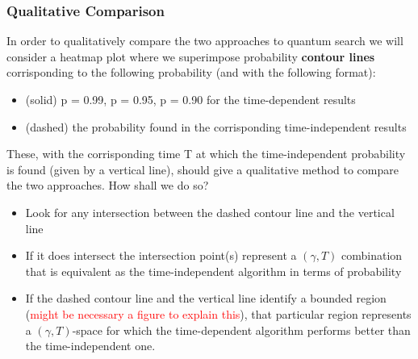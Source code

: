 \documentclass[aps,pra,reprint, onecolumn]{revtex4-2}
\newcommand{\red}[1]{\textcolor{red}{#1}}
\begin{document}
\subsubsection{\textbf{Qualitative Comparison}}
In order to qualitatively compare the two approaches to quantum search we will consider a heatmap plot where we superimpose probability \textbf{contour lines} corrisponding to the following probability (and with the following format):
\begin{itemize}
  \item (solid) p = 0.99, p = 0.95, p = 0.90 for the time-dependent results
  \item (dashed) the probability found in the corrisponding time-independent results
\end{itemize}
These, with the corrisponding time T at which the time-independent probability is found (given by a vertical line), should give a qualitative method to compare the two approaches. How shall we do so?
\begin{itemize}
	\item Look for any intersection between the dashed contour line and the vertical line
	\item If it does intersect the intersection point(s) represent a $(\gamma, T)$ combination that is equivalent as the time-independent algorithm in terms of probability
	\item If the dashed contour line and the vertical line identify a bounded region (\red{might be necessary a figure to explain this}), that particular region represents a $(\gamma, T)$-space for which the time-dependent algorithm performs better than the time-independent one. 
\end{itemize}
\end{document}
